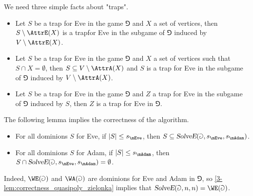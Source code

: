 We need three simple facts about "traps".

\begin{fact}
\label{3-fact:traps}\hfill
\begin{itemize}
	\item Let $S$ be a trap for Eve in the game $\Game$ and $X$ a set of vertices, 
	then $S \setminus \AttrE(X)$ is a trapfor Eve in the subgame of $\Game$ induced by $V \setminus \AttrE(X)$.
	\item Let $S$ be a trap for Eve in the game $\Game$ and $X$ a set of vertices such that $S \cap X = \emptyset$, 
	then $S \subseteq V \setminus \AttrA(X)$ and $S$ is a trap for Eve in the subgame of $\Game$ induced by $V \setminus \AttrA(X)$.
	\item Let $S$ be a trap for Eve in the game $\Game$ and $Z$ a trap for Eve in the subgame of $\Game$ induced by $S$,
	then $Z$ is a trap for Eve in $\Game$.
\end{itemize}
\end{fact}

The following lemma implies the correctness of the algorithm.

\begin{lemma}
\label{3-lem:correctness_quasipoly_zielonka}\hfill
\begin{itemize}
	\item For all dominions $S$ for Eve, if $|S| \le s_{\mEve}$, then $S \subseteq \textsl{SolveE}(\Game,s_{\mEve},s_{\mAdam})$.
	\item For all dominions $S$ for Adam, if $|S| \le s_{\mAdam}$, then $S \cap \textsl{SolveE}(\Game,s_{\mEve},s_{\mAdam}) = \emptyset$.
\end{itemize}
\end{lemma}

Indeed, $\WE(\Game)$ and $\WA(\Game)$ are dominions for Eve and Adam in $\Game$, 
so \cref{3-lem:correctness_quasipoly_zielonka} implies that $\textsl{SolveE}(\Game,n,n) = \WE(\Game)$.

